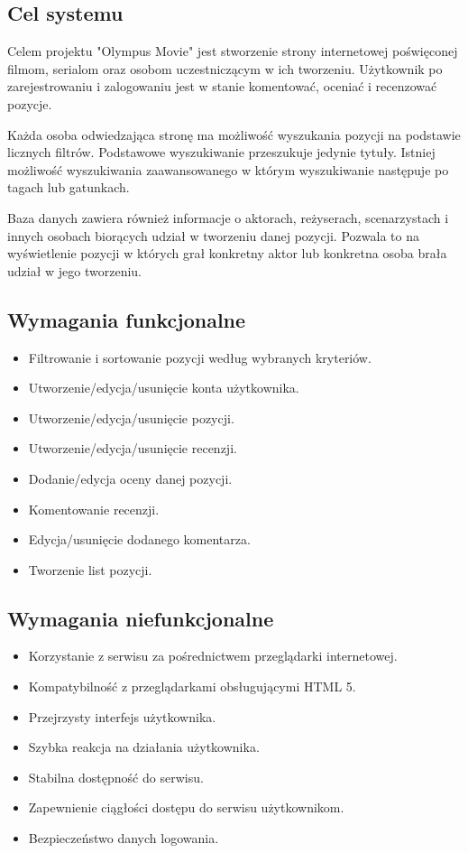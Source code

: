 \documentclass[12pt]{article}
\begin{document}
\begin{flushleft}
		\subsection{Cel systemu}	%
		Celem projektu "Olympus Movie" jest stworzenie strony internetowej poświęconej filmom, serialom oraz osobom uczestniczącym w ich tworzeniu. Użytkownik po zarejestrowaniu i zalogowaniu jest w stanie komentować, oceniać i recenzować pozycje.
	
	Każda osoba odwiedzająca stronę ma możliwość wyszukania pozycji na podstawie licznych filtrów. Podstawowe wyszukiwanie przeszukuje jedynie tytuły. Istniej możliwość wyszukiwania zaawansowanego w którym wyszukiwanie następuje po tagach lub gatunkach.
	
	Baza danych zawiera również informacje o aktorach, reżyserach, scenarzystach i innych osobach biorących udział w tworzeniu danej pozycji. Pozwala to na wyświetlenie pozycji w których grał konkretny aktor lub konkretna osoba brała udział w jego tworzeniu.
		
		\subsection{Wymagania funkcjonalne}
			\begin{itemize}
				\item Filtrowanie i sortowanie pozycji według wybranych kryteriów.
				\item Utworzenie/edycja/usunięcie konta użytkownika.
				\item Utworzenie/edycja/usunięcie pozycji.
				\item Utworzenie/edycja/usunięcie recenzji.
				\item Dodanie/edycja oceny danej pozycji.
				\item Komentowanie recenzji.
				\item Edycja/usunięcie dodanego komentarza.
				\item Tworzenie list pozycji.
			\end{itemize}
		
		\subsection{Wymagania niefunkcjonalne}
			\begin{itemize}
				\item Korzystanie z serwisu za pośrednictwem przeglądarki internetowej.
				\item Kompatybilność z przeglądarkami obsługującymi HTML 5.
				\item Przejrzysty interfejs użytkownika.
				\item Szybka reakcja na działania użytkownika.
				\item Stabilna dostępność do serwisu.
				\item Zapewnienie ciągłości dostępu do serwisu użytkownikom.
				\item Bezpieczeństwo danych logowania.
			\end{itemize}
		

\end{flushleft}
\end{document}
